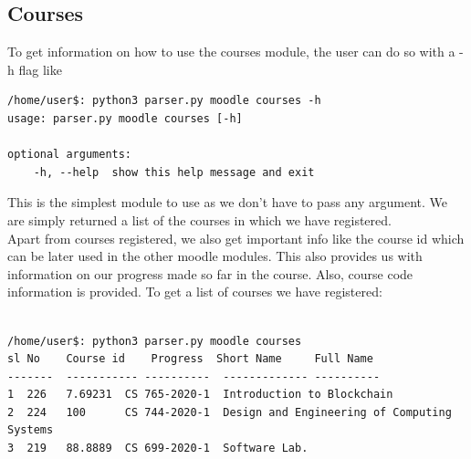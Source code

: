 \documentclass[12pt, letterpaper, twoside]{article}
\begin{document}
\subsection{Courses}
To get information on how to use the courses module, the user can do so with a -h flag like 
\begin{verbatim}
/home/user$: python3 parser.py moodle courses -h
usage: parser.py moodle courses [-h]

optional arguments:
    -h, --help  show this help message and exit
\end{verbatim}
This is the simplest module to use as we don't have to pass any argument. We are simply returned a list of the courses in which we have registered.\\
Apart from courses registered, we also get important info like the course id which can be later used in the other moodle modules.
This also provides us with information on our progress made so far in the course.
Also, course code information is provided.
To get a list of courses we have registered:\\
\\
\begin{verbatim}
/home/user$: python3 parser.py moodle courses
sl No    Course id    Progress  Short Name     Full Name
-------  ----------- ----------  ------------- ----------
1  226   7.69231  CS 765-2020-1  Introduction to Blockchain
2  224   100      CS 744-2020-1  Design and Engineering of Computing Systems
3  219   88.8889  CS 699-2020-1  Software Lab.
\end{verbatim}
\end{document}
